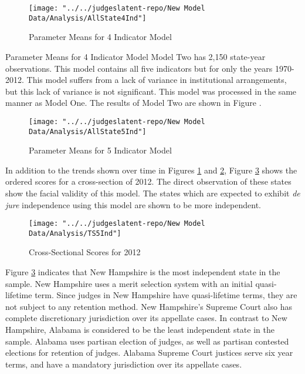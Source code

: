 \documentclass[12pt]{article}
\begin{document}
\begin{figure}[tbph]
\centering
\caption{Parameter Means for 4 Indicator Model}
\label{fig:AllState4Ind}
\texttt{[image: "../../judgeslatent-repo/New Model Data/Analysis/AllState4Ind"]}
\end{figure}

  Parameter Means for 4 Indicator Model
Model Two has 2,150 state-year observations. This model contains all five indicators but for only the years 1970-2012.  This model suffers from a lack of variance in institutional arrangements, but this lack of variance is not significant.  This model was processed in the same manner as Model One.  The results of Model Two are shown in Figure .

\begin{figure}[tbph]
\centering
\caption{Parameter Means for 5 Indicator Model}
\label{fig:AllState5Ind}
\texttt{[image: "../../judgeslatent-repo/New Model Data/Analysis/AllState5Ind"]}
\end{figure}

In addition to the trends shown over time in Figures \ref{fig:AllState4Ind} and \ref{fig:AllState5Ind}, Figure \ref{fig:TS5Ind} shows the ordered scores for a cross-section of 2012. The direct observation of these states show the facial validity of this model.  The states which are expected to exhibit \textit{de jure} independence using this model are shown to be more independent.  

\begin{figure}[tbh]
	\centering
	\caption{Cross-Sectional Scores for 2012}
	\label{fig:TS5Ind}
	\texttt{[image: "../../judgeslatent-repo/New Model Data/Analysis/TS5Ind"]}
\end{figure}

Figure \ref{fig:TS5Ind} indicates that New Hampshire is the most independent state in the sample.  New Hampshire uses a merit selection system with an initial quasi-lifetime term.  Since judges in New Hampshire have quasi-lifetime terms, they are not subject to any retention method.  New Hampshire's Supreme Court also has complete discretionary jurisdiction over its appellate cases.  In contrast to New Hampshire, Alabama is considered to be the least independent state in the sample.  Alabama uses partisan election of judges, as well as partisan contested elections for retention of judges.  Alabama Supreme Court justices serve six year terms, and have a mandatory jurisdiction over its appellate cases.
\end{document}

